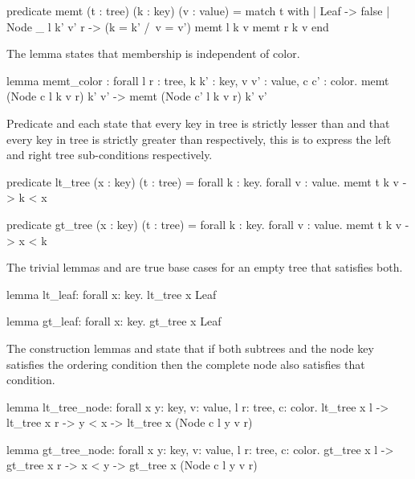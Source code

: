 \begin{whylang}
    predicate memt (t : tree) (k : key) (v : value) =
        match t with
        | Leaf -> false
        | Node _ l k' v' r -> (k = k' /\ v = v') \/ memt l k v \/ memt r k v
        end
\end{whylang}

The lemma  states that membership is independent of  color.

\begin{whylang}
    lemma memt_color :
        forall l r : tree, k k' : key, v v' : value, c c' : color.
        memt (Node c l k v r) k' v' -> memt (Node c' l k v r) k' v'
\end{whylang}

Predicate  and  each state that every key in tree  is strictly lesser than  and 
that every key in tree  is strictly greater than  respectively, this is to express the left and right tree sub-conditions 
respectively.

\begin{whylang}
    predicate lt_tree (x : key) (t : tree) =
        forall k : key. forall v : value. memt t k v -> k < x

    predicate gt_tree (x : key) (t : tree) =
        forall k : key. forall v : value. memt t k v -> x < k
\end{whylang}

The trivial lemmas  and  are true base cases for an empty tree that satisfies both.

\begin{whylang}
    lemma lt_leaf: forall x: key. lt_tree x Leaf

    lemma gt_leaf: forall x: key. gt_tree x Leaf
\end{whylang}

The construction lemmas  and  state that if both subtrees and the node key
satisfies the ordering condition then the complete node also satisfies that condition.

\begin{whylang}
    lemma lt_tree_node:
        forall x y: key, v: value, l r: tree, c: color.
        lt_tree x l -> lt_tree x r -> y < x -> lt_tree x (Node c l y v r)

    lemma gt_tree_node:
        forall x y: key, v: value, l r: tree, c: color.
        gt_tree x l -> gt_tree x r -> x < y -> gt_tree x (Node c l y v r)
\end{whylang}

